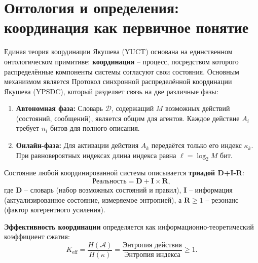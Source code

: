 \documentclass[12pt,a4paper]{article}
\newcommand{\Keff}{K_{\mathrm{eff}}}
\begin{document}
	\vspace{0.4cm}
	
	\section{Онтология и определения: координация как первичное понятие}
	\label{sec:ontology}
	
	Единая теория координации Якушева (YUCT) основана на единственном онтологическом примитиве: \textbf{координация} – процесс, посредством которого распределённые компоненты системы согласуют свои состояния. Основным механизмом является Протокол синхронной распределённой координации Якушева (YPSDC), который разделяет связь на две различные фазы:
	\begin{enumerate}
		\item \textbf{Автономная фаза:} Словарь \(\mathcal{D}\), содержащий \(M\) возможных действий (состояний, сообщений), является общим для агентов. Каждое действие \(A_i\) требует \(n_i\) битов для полного описания.
		\item \textbf{Онлайн-фаза:} Для активации действия \(A_k\) передаётся только его индекс \(\kappa_k\). При равновероятных индексах длина индекса равна \(\ell = \log_2 M\) бит.
	\end{enumerate}
	
	Состояние любой координированной системы описывается \textbf{триадой D+I-R}:
	\[
	\text{Реальность} = \mathbf{D} + \mathbf{I} \times \mathbf{R},
	\]
	где \(\mathbf{D}\) – словарь (набор возможных состояний и правил), \(\mathbf{I}\) – информация (актуализированное состояние, измеряемое энтропией), а \(\mathbf{R} \ge 1\) – резонанс (фактор когерентного усиления).
	
	\textbf{Эффективность координации} определяется как информационно-теоретический коэффициент сжатия:
	\begin{equation}
		\Keff = \frac{H(\mathcal{A})}{H(\kappa)} = \frac{\text{Энтропия действия}}{\text{Энтропия индекса}} \ge 1.
		\label{eq:keff-def}
	\end{equation}
	
	\begin{center}
	\end{center}
	
\end{document}
